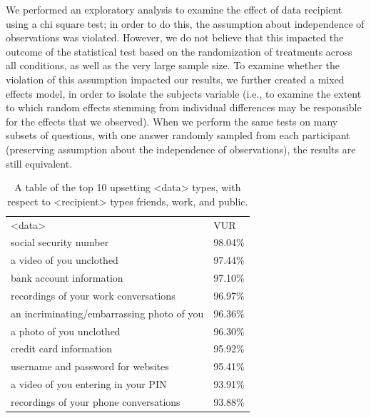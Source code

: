 \documentclass{acm_proc_article-sp}
\begin{document}

We performed an exploratory analysis to examine the effect of data recipient using a chi square test; in order to do this, the assumption about independence of observations was violated. However, we do not believe that this impacted the outcome of the statistical test based on the randomization of treatments across all conditions, as well as the very large sample size. To examine whether the violation of this assumption impacted our results, we further created a mixed effects model, in order to isolate the subjects variable (i.e., to examine the extent to which random effects stemming from individual differences may be responsible for the effects that we observed). When we perform the same tests on many subsets of questions, with one answer randomly sampled from each participant (preserving assumption about the independence of observations), the results are still equivalent. 

\begin{table}%
\begin{center}
\begin{tabular}{ll}
<data> & VUR  \\
social security number & 98.04\% \\
a video of you unclothed & 97.44\% \\
bank account information & 97.10\% \\
recordings of your work conversations & 96.97\% \\
an incriminating/embarrassing photo of you & 96.36\% \\
a photo of you unclothed & 96.30\% \\
credit card information & 95.92\% \\
username and password for websites & 95.41\% \\
a video of you entering in your PIN & 93.91\% \\
recordings of your phone conversations & 93.88\% \\
\end{tabular}
\caption{A table of the top 10 upsetting <data> types, with respect to <recipient> types friends, work, and public.}
\label{sharedtop10}
\end{center}
\end{table}
\end{document}
